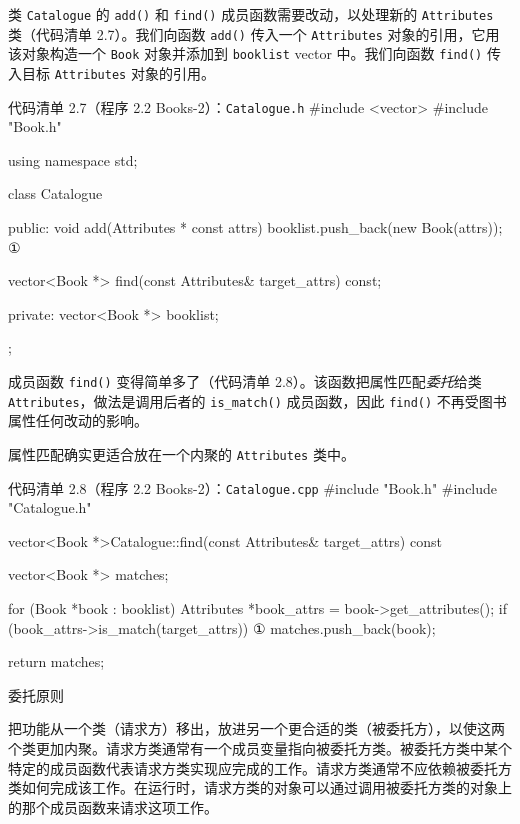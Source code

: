 类 \texttt{Catalogue} 的 \texttt{add()} 和 \texttt{find()} 成员函数需要改动，以处理新的 \texttt{Attributes} 类（代码清单 2.7）。我们向函数 \texttt{add()} 传入一个 \texttt{Attributes} 对象的引用，它用该对象构造一个 \texttt{Book} 对象并添加到 \texttt{booklist} vector 中。我们向函数 \texttt{find()} 传入目标 \texttt{Attributes} 对象的引用。

\begin{codeboxt}{代码清单 2.7（程序 2.2 Books-2）：\texttt{Catalogue.\allowbreak{}h}}
#include <vector>
#include "Book.h"

using namespace std;

class Catalogue
{
public:
    void add(Attributes * const attrs)
    {
        booklist.push_back(new Book(attrs));     ①
    }

    vector<Book *> find(const Attributes& target_attrs) const;

private:
    vector<Book *> booklist;
};
\end{codeboxt}
\par

成员函数 \texttt{find()} 变得简单多了（代码清单 2.8）。该函数把属性匹配\emph{委托}给类 \texttt{Attributes}，做法是调用后者的 \texttt{is\_\allowbreak{}match(\allowbreak{})\allowbreak{}} 成员函数，因此 \texttt{find()} 不再受图书属性任何改动的影响。


属性匹配确实更适合放在一个内聚的 \texttt{Attributes} 类中。

\begin{codeboxt}{代码清单 2.8（程序 2.2 Books-2）：\texttt{Catalogue.\allowbreak{}cpp}}
#include "Book.h"
#include "Catalogue.h"

vector<Book *>Catalogue::find(const Attributes& target_attrs) const
{
    vector<Book *> matches;

    for (Book *book : booklist)
    {
        Attributes *book_attrs = book->get_attributes();
        if (book_attrs->is_match(target_attrs))            ①
        {
            matches.push_back(book);
        }
    }

    return matches;
}
\end{codeboxt}
\par

\begin{mySidebar}{委托原则}

把功能从一个类（请求方）移出，放进另一个更合适的类（被委托方），以使这两个类更加内聚。请求方类通常有一个成员变量指向被委托方类。被委托方类中某个特定的成员函数代表请求方类实现应完成的工作。请求方类通常不应依赖被委托方类如何完成该工作。在运行时，请求方类的对象可以通过调用被委托方类的对象上的那个成员函数来请求这项工作。
\end{mySidebar}

